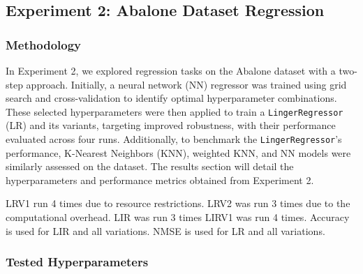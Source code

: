 \documentclass[a4paper, 12pt]{report}
\begin{document}
\subsection{Experiment 2: Abalone Dataset Regression}
\subsubsection{Methodology}

In Experiment 2, we explored regression tasks on the Abalone dataset with a two-step approach. 
Initially, a neural network (NN) regressor was trained using grid search and cross-validation to identify optimal hyperparameter combinations. 
These selected hyperparameters were then applied to train a \texttt{LingerRegressor} (LR) and its variants, targeting improved robustness, 
with their performance evaluated across four runs. Additionally, to benchmark the \texttt{LingerRegressor}'s performance, K-Nearest Neighbors (KNN), 
weighted KNN, and NN models were similarly assessed on the dataset. The results section will detail the hyperparameters and performance metrics obtained from Experiment 2.

LRV1 run 4 times due to resource restrictions.
LRV2 was run 3 times due to the computational overhead.
LIR was run 3 times
LIRV1 was run 4 times. 
Accuracy is used for LIR and all variations. NMSE is used for LR and all variations.
\subsubsection{Tested Hyperparameters}
\end{document}
